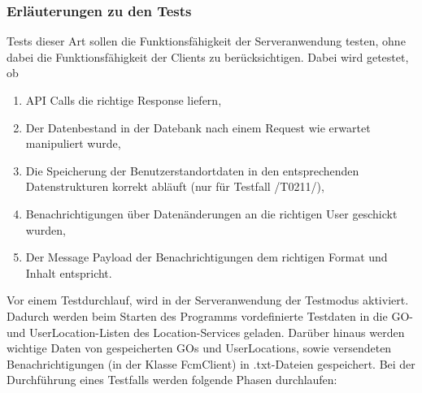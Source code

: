 \documentclass[11pt,a4paper]{scrartcl}
\begin{document}
\subsubsection{Erläuterungen zu den Tests}
Tests dieser Art sollen die Funktionsfähigkeit der Serveranwendung testen, ohne dabei die Funktionsfähigkeit der Clients zu berücksichtigen. Dabei wird getestet, ob
\begin{enumerate}
	\item API Calls die richtige Response liefern,
	\item Der Datenbestand in der Datebank nach einem Request wie erwartet manipuliert wurde,
	\item Die Speicherung der Benutzerstandortdaten in den entsprechenden Datenstrukturen korrekt abläuft (nur für Testfall /T0211/),
	\item Benachrichtigungen über Datenänderungen an die richtigen User geschickt wurden,
	\item Der Message Payload der Benachrichtigungen dem richtigen Format und Inhalt entspricht.
\end{enumerate}

Vor einem Testdurchlauf, wird in der Serveranwendung der Testmodus aktiviert. Dadurch werden beim Starten des Programms vordefinierte Testdaten in die GO- und UserLocation-Listen des Location-Services geladen. Darüber hinaus werden wichtige Daten von gespeicherten GOs und UserLocations, sowie versendeten Benachrichtigungen (in der Klasse FcmClient) in .txt-Dateien gespeichert.
Bei der Durchführung eines Testfalls werden folgende Phasen durchlaufen:
\end{document}

